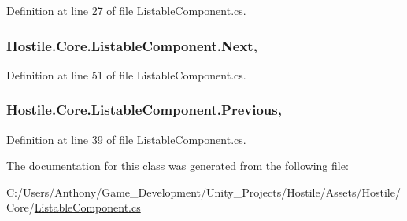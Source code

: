 Definition at line 27 of file Listable\-Component.\-cs.

\hypertarget{class_hostile_1_1_core_1_1_listable_component_a8983c35cc8a49a5e43d143ae9b4929bd}{
\subsubsection[{Next}]{ Hostile.\-Core.\-Listable\-Component.\-Next\hspace{0.3cm}{\ttfamily [get]}, {\ttfamily [set]}}}\label{class_hostile_1_1_core_1_1_listable_component_a8983c35cc8a49a5e43d143ae9b4929bd}


Definition at line 51 of file Listable\-Component.\-cs.

\hypertarget{class_hostile_1_1_core_1_1_listable_component_adc5c06457ac3a0d21602349789adb7fc}{
\subsubsection[{Previous}]{ Hostile.\-Core.\-Listable\-Component.\-Previous\hspace{0.3cm}{\ttfamily [get]}, {\ttfamily [set]}}}\label{class_hostile_1_1_core_1_1_listable_component_adc5c06457ac3a0d21602349789adb7fc}


Definition at line 39 of file Listable\-Component.\-cs.



The documentation for this class was generated from the following file\-:\begin{DoxyCompactItemize}
\item 
C\-:/\-Users/\-Anthony/\-Game\-\_\-\-Development/\-Unity\-\_\-\-Projects/\-Hostile/\-Assets/\-Hostile/\-Core/\hyperlink{_listable_component_8cs}{Listable\-Component.\-cs}\end{DoxyCompactItemize}
